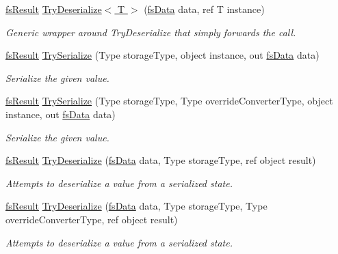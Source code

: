 \begin{DoxyCompactItemize}
\hyperlink{struct_full_serializer_1_1fs_result}{fs\+Result} \hyperlink{class_full_serializer_1_1fs_serializer_aa9ce7d2b3fe6c0057504cba48b63e649}{Try\+Deserialize$<$ T $>$} (\hyperlink{class_full_serializer_1_1fs_data}{fs\+Data} data, ref T instance)
\begin{DoxyCompactList}\small\item\em Generic wrapper around Try\+Deserialize that simply forwards the call. \end{DoxyCompactList}\item 
\hyperlink{struct_full_serializer_1_1fs_result}{fs\+Result} \hyperlink{class_full_serializer_1_1fs_serializer_a17e5574115d10ded25ac40d46eeae4f2}{Try\+Serialize} (Type storage\+Type, object instance, out \hyperlink{class_full_serializer_1_1fs_data}{fs\+Data} data)
\begin{DoxyCompactList}\small\item\em Serialize the given value. \end{DoxyCompactList}\item 
\hyperlink{struct_full_serializer_1_1fs_result}{fs\+Result} \hyperlink{class_full_serializer_1_1fs_serializer_a02eb0a2533b600eada768fcbaba86d63}{Try\+Serialize} (Type storage\+Type, Type override\+Converter\+Type, object instance, out \hyperlink{class_full_serializer_1_1fs_data}{fs\+Data} data)
\begin{DoxyCompactList}\small\item\em Serialize the given value. \end{DoxyCompactList}\item 
\hyperlink{struct_full_serializer_1_1fs_result}{fs\+Result} \hyperlink{class_full_serializer_1_1fs_serializer_a9ada1781fcc582b65d809815fe2c24e9}{Try\+Deserialize} (\hyperlink{class_full_serializer_1_1fs_data}{fs\+Data} data, Type storage\+Type, ref object result)
\begin{DoxyCompactList}\small\item\em Attempts to deserialize a value from a serialized state. \end{DoxyCompactList}\item 
\hyperlink{struct_full_serializer_1_1fs_result}{fs\+Result} \hyperlink{class_full_serializer_1_1fs_serializer_a16a24f10dfdc70f69e2ace4f2e4d891e}{Try\+Deserialize} (\hyperlink{class_full_serializer_1_1fs_data}{fs\+Data} data, Type storage\+Type, Type override\+Converter\+Type, ref object result)
\begin{DoxyCompactList}\small\item\em Attempts to deserialize a value from a serialized state. \end{DoxyCompactList}\end{DoxyCompactItemize}
